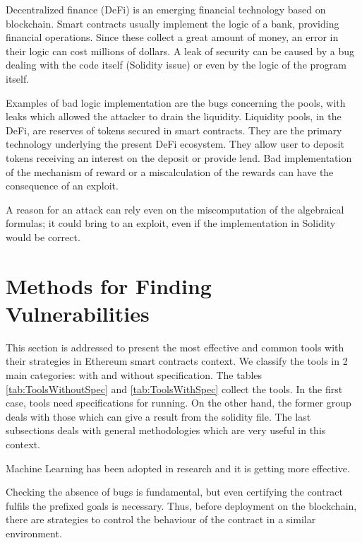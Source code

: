 \documentclass[a4paper,sigconf, language=french,
language=german, language=spanish, language=english]{acmart}
\begin{document}
Decentralized finance (DeFi) is an emerging financial technology based on blockchain. Smart contracts usually implement the logic of a bank, providing financial operations. Since these collect a great amount of money, an error in their logic can cost millions of dollars. A leak of security can be caused by a bug dealing with the code itself (Solidity issue) or even by the logic of the program itself.  

Examples of bad logic implementation are the bugs concerning the pools, with leaks which allowed the attacker to drain the liquidity.
Liquidity pools, in the DeFi, are reserves of tokens secured in smart contracts. They are the primary technology underlying the present DeFi ecosystem. They allow user to deposit tokens receiving an interest on the deposit or provide lend. Bad implementation of the mechanism of reward or a miscalculation of the rewards can have the consequence of an exploit. 

A reason for an attack can rely even on the miscomputation of the algebraical formulas; it could bring to an exploit, even if the implementation in Solidity would be correct.


\section{Methods for Finding Vulnerabilities}
\label{MethodologiesForTools}
This section is addressed to present the most effective and common tools with their strategies in Ethereum smart contracts context. 
We classify the tools in 2 main categories: with and without specification. The tables \ref{tab:ToolsWithoutSpec} and \ref{tab:ToolsWithSpec} collect the tools. 
In the first case, tools need specifications for running. On the other hand,  the former group 
deals with those which can give a result from the solidity file.
The last subsections deals with general methodologies which are very useful in this context. 

Machine Learning has been adopted in research and it is getting more effective. 

Checking the absence of bugs is fundamental, but even certifying the contract fulfils the prefixed goals is necessary. Thus, before deployment on the blockchain, there are strategies to control the behaviour of the contract in a similar environment.
\end{document}
